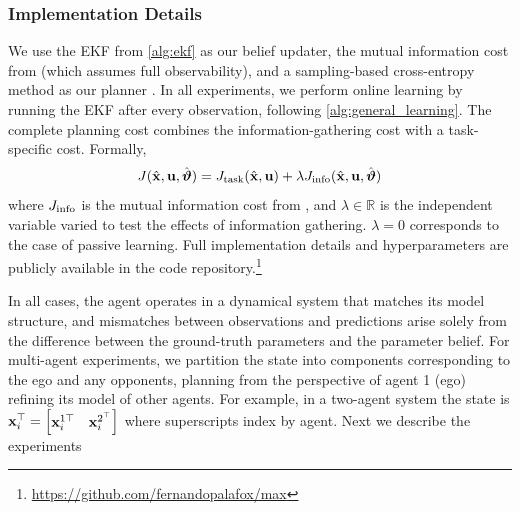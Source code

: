 

\subsubsection{Implementation Details} 

We use the EKF from \cref{alg:ekf} as our belief updater, the mutual information cost from  (which assumes full observability), and a sampling-based cross-entropy method as our planner \cite{pinneri2021sample}.
In all experiments, we perform online learning by running the EKF after every observation, following \cref{alg:general_learning}.
The complete planning cost combines the information-gathering cost with a task-specific cost.
Formally,
\begin{equation}
    J(\hat{\mathbf{x}}, \mathbf{u}, \hat{\boldsymbol{{\vartheta}}}) = J_{\text{task}}(\hat{\mathbf{x}}, \mathbf{u}) + \lambda J_{\text{info}}(\hat{\mathbf{x}}, \mathbf{u}, \hat{\boldsymbol{{\vartheta}}})
\end{equation}
where $J_{\text{info}}$ is the mutual information cost from , and $\lambda \in \mathbb{R}$ is the independent variable varied to test the effects of information gathering. 
$\lambda = 0$ corresponds to the case of passive learning.
Full implementation details and hyperparameters are publicly available in the code repository.\footnote{\url{https://github.com/fernandopalafox/max}}

In all cases, the agent operates in a dynamical system that matches its model structure, and mismatches between observations and predictions arise solely from the difference between the ground-truth parameters and the parameter belief.
For multi-agent experiments, we partition the state into components corresponding to the ego and any opponents, planning from the perspective of agent 1 (ego) refining its model of other agents. 
For example, in a two-agent system the state is $\mathbf{x}_i^\top = \begin{bmatrix}
        \mathbf{x}_i^{1\top} & 
        \mathbf{x}_i^{2^\top}
    \end{bmatrix}$
where superscripts index by agent.
Next we describe the experiments


